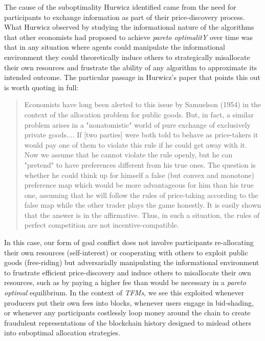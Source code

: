 The cause of the suboptimality Hurwicz identified came from the need for participants to exchange information as part of their price-discovery process. What Hurwicz observed by studying the informational nature of the algorithms that other economists had proposed to achieve \textit{pareto optimalitY} over time was that in any situation where agents could manipulate the informational environment they could theoretically induce others to strategically misallocate their own resources and frustrate the ability of any algorithm to approximate its intended outcome. The particular passage in Hurwicz's paper that points this out is worth quoting in full:

\begin{quote}
Economists have long been alerted to this issue by Samuelson (1954) in the context of the allocation problem for public goods. But, in fact, a similar problem arises in a "nonatomistic" world of pure exchange of exclusively private goods.... If [two parties] were both told to behave as price-takers it would pay one of them to violate this rule if he could get away with it. Now we assume that he cannot violate the rule openly, but he can "pretend" to have preferences different from his true ones. The question is whether he could think up for himself a false (but convex and monotone) preference map which would be more advantageous for him than his true one, assuming that he will follow the rules of price-taking according to the false map while the other trader plays the game honestly. It is easily shown that the answer is in the affirmative. Thus, in such a situation, the rules of perfect competition are not incentive-compatible.
\end{quote}

In this case, our form of goal conflict does not involve participants re-allocating their own resources (self-interest) or cooperating with others to exploit public goods (free-riding) but adversarially manipulating the informational environment to frustrate efficient price-discovery and induce others to misallocate their own resources, such as by paying a higher fee than would be necessary in a \textit{pareto optimal} equilibrium. In the context of \textit{TFMs}, we see this exploited whenever producers put their own fees into blocks, whenever users engage in bid-shading, or whenever any participants costlessly loop money around the chain to create fraudulent representations of the blockchain history designed to mislead others into suboptimal allocation strategies.


